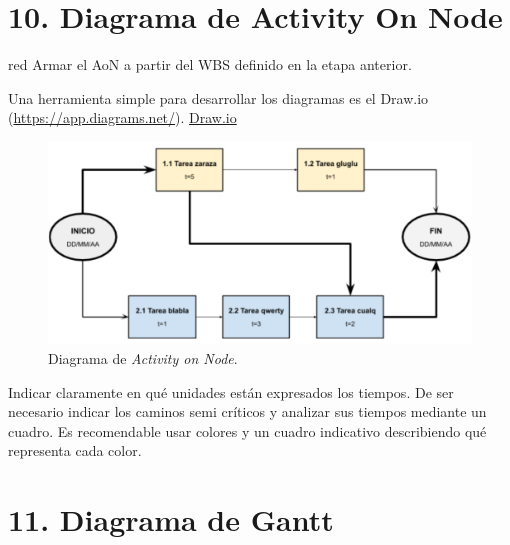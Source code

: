 \documentclass[
11pt, %
]{charter}
\begin{document}
\section{10. Diagrama de Activity On Node}
\label{sec:AoN}

\begin{consigna}{red}
  Armar el AoN a partir del WBS definido en la etapa anterior.

  Una herramienta simple para desarrollar los diagramas es el Draw.io (\url{https://app.diagrams.net/}).
  \href{https://app.diagrams.net}{Draw.io}


  \begin{figure}[htpb]
    \centering
    \includegraphics[width=.8\textwidth]{./Figuras/AoN.png}
    \caption{Diagrama de \textit{Activity on Node}.}
    \label{fig:AoN}
  \end{figure}

  Indicar claramente en qué unidades están expresados los tiempos.
  De ser necesario indicar los caminos semi críticos y analizar sus tiempos mediante un cuadro.
  Es recomendable usar colores y un cuadro indicativo describiendo qué representa cada color.

\end{consigna}

\section{11. Diagrama de Gantt}
\label{sec:gantt}
\end{document}

